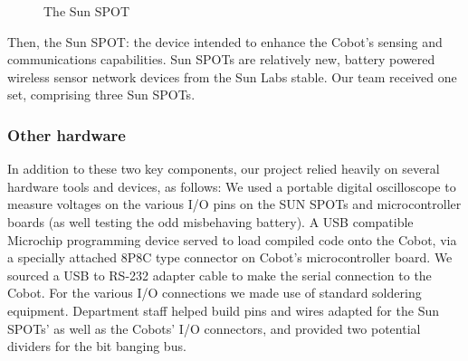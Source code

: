 \documentclass[a4paper,10pt]{article} %
\begin{document}
\begin{figure}[H]
    \centering
    \caption{The Sun SPOT}
    \label{fig:sunspotviews}
\end{figure}

Then, the Sun SPOT: the device intended to enhance the Cobot's sensing and
communications capabilities. Sun SPOTs are relatively new, battery powered
wireless sensor network devices from the Sun Labs stable. Our team received one
set, comprising three Sun SPOTs.

\subsubsection{Other hardware}

\noindent In addition to these two key components, our project relied heavily on
several hardware tools and devices, as follows: We used a portable digital
oscilloscope to measure voltages on the various I/O pins on the SUN SPOTs and
microcontroller boards (as well testing the odd misbehaving battery). A USB
compatible Microchip programming device served to load compiled code onto the
Cobot, via a specially attached 8P8C type connector on Cobot's microcontroller
board. We sourced a USB to RS-232 adapter cable to make the serial connection to
the Cobot. For the various I/O connections we made use of standard soldering
equipment. Department staff helped build pins and wires adapted for the Sun
SPOTs' as well as the Cobots' I/O connectors, and provided two potential
dividers for the bit banging bus.
\end{document}
